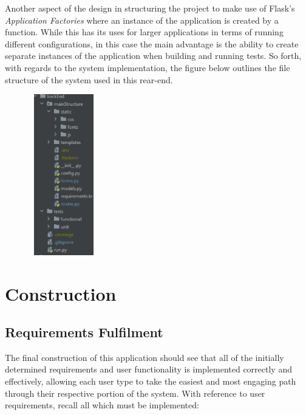 \documentclass[11pt, english]{article}
\begin{document}
	Another aspect of the design in structuring the project to make use of Flask's \textit{Application Factories} where an instance of the application is created by a function. While this has its uses for larger applications in terms of running different configurations, in this case the main advantage is the ability to create separate instances of the application when building and running tests. So forth, with regards to the system implementation, the figure below outlines the file structure of the system used in this rear-end. 

	\begin{figure}[H]
        \begin{center}
                \includegraphics[width=3cm,height=7cm]{CS993_IMG/File_Structure.png}
        \end{center}
        \end{figure}

\newpage

\section{Construction}

	\subsection{Requirements Fulfilment}

	The final construction of this application should see that all of the initially determined requirements and user functionality is implemented correctly and effectively, allowing each user type to take the easiest and most engaging path through their respective portion of the system. With reference to user requirements, recall all which must be implemented:
\end{document}

